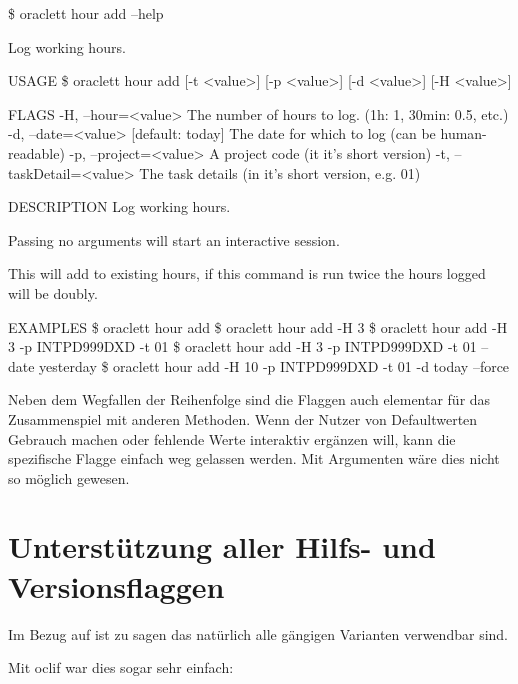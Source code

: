\documentclass[oneside,bibliography=totocnumbered,BCOR=5mm]{scrbook}
\newenvironment{code}{\captionsetup{type=listing, skip=0pt}}{}
\begin{document}
\begin{code}
  \begin{shellcode}
\$ oraclett hour add --help

Log working hours.

USAGE
  \$ oraclett hour add [-t <value>] [-p <value>] [-d <value>] [-H <value>]

FLAGS
  -H, --hour=<value>        The number of hours to log. (1h: 1, 30min: 0.5, etc.)
  -d, --date=<value>        [default: today] The date for which to log (can be human-readable)
  -p, --project=<value>     A project code (it it's short version)
  -t, --taskDetail=<value>  The task details (in it's short version, e.g. 01)

DESCRIPTION
  Log working hours.

  Passing no arguments will start an interactive session.

  This will add to existing hours, if this command is run twice the hours logged will be doubly.

EXAMPLES
  \$ oraclett hour add
  \$ oraclett hour add -H 3
  \$ oraclett hour add -H 3 -p INTPD999DXD -t 01
  \$ oraclett hour add -H 3 -p INTPD999DXD -t 01 --date yesterday
  \$ oraclett hour add -H 10 -p INTPD999DXD -t 01 -d today --force
  \end{shellcode}
  \medskip
\end{code}

Neben dem Wegfallen der Reihenfolge sind die Flaggen auch elementar für das
Zusammenspiel mit anderen Methoden. Wenn der Nutzer von Defaultwerten Gebrauch
machen oder fehlende Werte interaktiv ergänzen will, kann die spezifische Flagge
einfach weg gelassen werden. Mit Argumenten wäre dies nicht so möglich gewesen.



\section{Unterstützung aller Hilfs- und Versionsflaggen}

Im Bezug auf  ist zu sagen das natürlich alle
gängigen Varianten verwendbar sind.

Mit oclif war dies sogar sehr einfach:
\begin{code}
  \begin{javascriptcode}
...
"oclif": {
  "additionalHelpFlags": [
    "-h",
    "help"
  ],
  "additionalVersionFlags": [
    "-v",
    "-V",
    "version"
  ],
  ...
  \end{javascriptcode}
  \medskip
\end{code}
\end{document}
